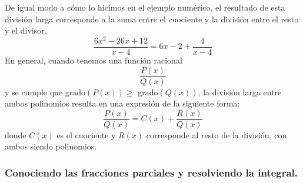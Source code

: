 \documentclass[12pt]{article}
\begin{document}
De igual modo a cómo lo hicimos en el ejemplo numérico, el resultado de esta división larga corresponde a la suma entre el cuociente y la división entre el resto y el divisor.
\[
  \frac{6x^{2} - 26x + 12}{x - 4} = 6x - 2 + \frac{4}{x - 4}
\]
En general, cuando tenemos una función racional
\[
  \frac{P(x)}{Q(x)}
\]
y se cumple que grado$(P(x)) \geq$ grado$(Q(x))$, la división larga entre ambos polinomios resulta en una expresión de la siguiente forma:
\[
  \frac{P(x)}{Q(x)} = C(x) + \frac{R(x)}{Q(x)}
\]
donde $C(x)$ es el cuociente y $R(x)$ corresponde al resto de la división, con ambos siendo polinomios.

\subsubsection{Conociendo las fracciones parciales y resolviendo la integral.}
\end{document}
